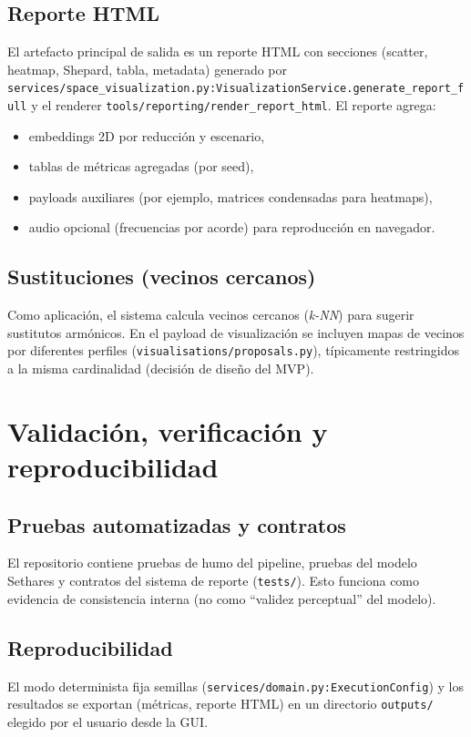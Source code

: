 \subsection{Reporte HTML}
El artefacto principal de salida es un reporte HTML con secciones (scatter, heatmap, Shepard, tabla, metadata) generado por \texttt{services/space\_visualization.py:VisualizationService.generate\_report\_full} y el renderer \texttt{tools/reporting/render\_report\_html}. El reporte agrega:
\begin{itemize}
  \item embeddings 2D por reducción y escenario,
  \item tablas de métricas agregadas (por seed),
  \item payloads auxiliares (por ejemplo, matrices condensadas para heatmaps),
  \item audio opcional (frecuencias por acorde) para reproducción en navegador.
\end{itemize}

\subsection{Sustituciones (vecinos cercanos)}
Como aplicación, el sistema calcula vecinos cercanos (\emph{k-NN}) para sugerir sustitutos armónicos. En el payload de visualización se incluyen mapas de vecinos por diferentes perfiles (\texttt{visualisations/proposals.py}), típicamente restringidos a la misma cardinalidad (decisión de diseño del MVP).

\section{Validación, verificación y reproducibilidad}
\label{sec:validacion}

\subsection{Pruebas automatizadas y contratos}
El repositorio contiene pruebas de humo del pipeline, pruebas del modelo Sethares y contratos del sistema de reporte (\texttt{tests/}). Esto funciona como evidencia de consistencia interna (no como “validez perceptual” del modelo).

\subsection{Reproducibilidad}
El modo determinista fija semillas (\texttt{services/domain.py:ExecutionConfig}) y los resultados se exportan (métricas, reporte HTML) en un directorio \texttt{outputs/} elegido por el usuario desde la GUI.

